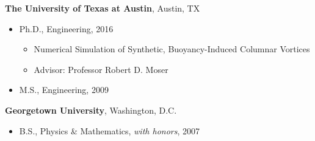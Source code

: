 %
\textbf{The University of Texas at Austin}, 
Austin, TX
\begin{itemize}

\item Ph.D., 
        Engineering, 2016
        \begin{itemize}
        \item \small{Numerical Simulation of Synthetic, 
	      Buoyancy-Induced Columnar Vortices}
        \item Advisor: Professor Robert D. Moser
        \end{itemize}

\item M.S., 
      Engineering, 2009 

\end{itemize}

\textbf{Georgetown University}, 
Washington, D.C. 
\begin{itemize}

\item B.S., 
        Physics \& Mathematics, \emph{with honors}, 2007
\end{itemize}


